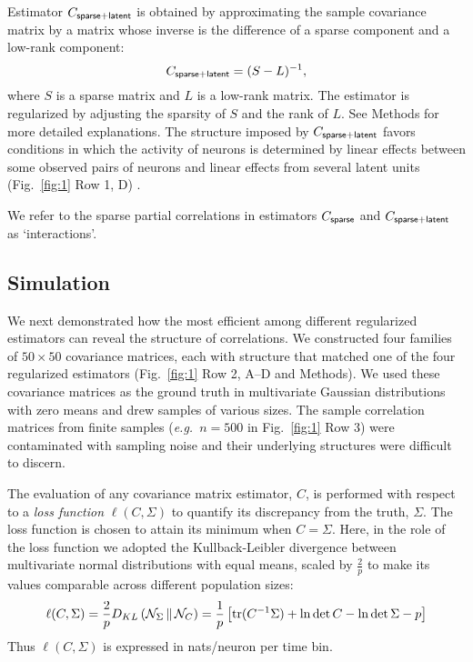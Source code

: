 Estimator $C_{\sf sparse+latent}$ is obtained by approximating the sample covariance matrix by a matrix whose inverse is the difference of a sparse component and a low-rank component:
\begin{equation}\label{eq:c-sl}
C_{\sf sparse+latent} = (S - L)^{-1},
\end{equation}
where $S$ is a sparse matrix and $L$ is a low-rank matrix. The estimator is regularized by adjusting the sparsity of $S$ and the rank of $L$. See Methods for more detailed explanations. The structure imposed by $C_{\sf sparse+latent}$ favors conditions in which the activity of neurons is determined by linear effects between some observed pairs of neurons and linear effects from several latent units (Fig.~\ref{fig:1} Row 1, D) \cite{Chandrasekaran:2010,Ma:2013}.

We refer to the sparse partial correlations in estimators $C_{\sf sparse}$ and $C_{\sf sparse+latent}$ as `interactions'.

\subsection*{Simulation}
We next demonstrated how the most efficient among different regularized estimators can reveal the structure of correlations.
We constructed four families of $50\times 50$ covariance matrices, each with structure that matched one of the four regularized estimators (Fig.~\ref{fig:1} Row 2, A--D and Methods).  We used these covariance matrices as the ground truth in multivariate Gaussian distributions with zero means and drew samples of various sizes. 
The sample correlation matrices from finite samples (\emph{e.g.}\ $n=500$ in Fig.~\ref{fig:1} Row 3) were contaminated with sampling noise and their underlying structures were difficult to discern.

The evaluation of any covariance matrix estimator, $C$, is performed with respect to a \emph{loss function} $\ell(C,\Sigma)$ to quantify its discrepancy from the truth, $\Sigma$.  The loss function is chosen to attain its minimum when $C=\Sigma$.
Here, in the role of the loss function we adopted the Kullback-Leibler divergence between multivariate normal distributions with equal means, scaled by $\frac 2 p$ to make its values comparable across different population sizes: 
\begin{equation}\label{eq:loss}
    \ell(C,\Sigma) = 
    \frac 2 p D_{KL}\left(\mathcal N_\Sigma\,\Vert\,\mathcal N_C\right) = 
    \frac 1 {p} \left[\operatorname{tr}(C^{-1}\Sigma) + \ln\det C - \ln\det\Sigma - p\right] 
\end{equation}
Thus $\ell(C,\Sigma)$ is expressed in nats/neuron per time bin.


